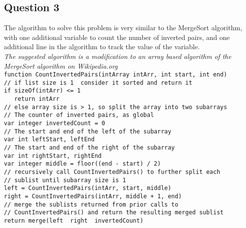 \documentclass{article}
\begin{document}
\subsection*{Question 3}
The algorithm to solve this problem is very similar to the MergeSort algorithm,
with one additional variable to count the number of inverted pairs, and one
additional line in the algorithm to track the value of the variable.\\
\textit{The suggested algorithm is a modification to an array based algorithm
of the MergeSort algorithm on Wikipedia.org}\\

\vspace{0.5cm} \texttt{function CountInvertedPairs(intArray intArr, int
start, int end)}\\
\texttt{// if list size is 1\, consider it sorted and return it}\\
\texttt{if sizeOf(intArr) <= 1}\\
\texttt{$\quad$    return intArr}\\
\texttt{// else array size is > 1, so split the array into two subarrays}\\
\texttt{// The counter of inverted pairs, as global}\\
\texttt{var integer invertedCount = 0}\\
\texttt{// The start and end of the left of the subarray }\\
\texttt{var int leftStart, leftEnd }\\
\texttt{// The start and end of the right of the subarray }\\
\texttt{var int rightStart, rightEnd }\\
\texttt{var integer middle = floor((end - start) / 2)}\\
\texttt{// recursively call CountInvertedPairs() to further split each}\\
\texttt{// sublist until subarray size is 1}\\
\texttt{left = CountInvertedPairs(intArr, start, middle)}\\
\texttt{right = CountInvertedPairs(intArr, middle + 1, end)}\\
\texttt{// merge the sublists returned from prior calls to}\\
\texttt{// CountInvertedPairs() and return the resulting merged sublist}\\
\texttt{return merge(left\, right\, invertedCount)}\\
\end{document}
